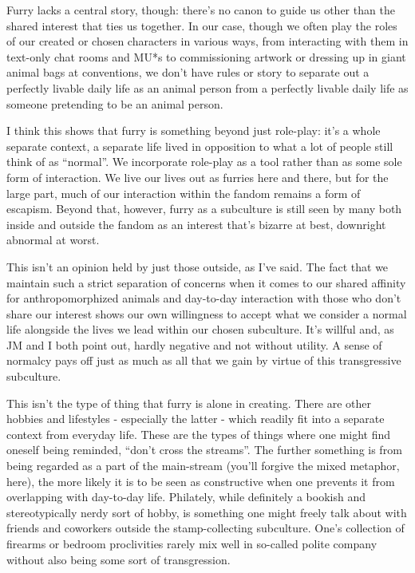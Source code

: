 Furry lacks a central story, though: there's no canon to guide us other
than the shared interest that ties us together. In our case, though we
often play the roles of our created or chosen characters in various
ways, from interacting with them in text-only chat rooms and MU*s to
commissioning artwork or dressing up in giant animal bags at
conventions, we don't have rules or story to separate out a perfectly
livable daily life as an animal person from a perfectly livable daily
life as someone pretending to be an animal person.

I think this shows that furry is something beyond just role-play: it's a
whole separate context, a separate life lived in opposition to what a
lot of people still think of as ``normal''. We incorporate role-play as
a tool rather than as some sole form of interaction. We live our lives
out as furries here and there, but for the large part, much of our
interaction within the fandom remains a form of escapism. Beyond that,
however, furry as a subculture is still seen by many both inside and
outside the fandom as an interest that's bizarre at best, downright
abnormal at worst.

This isn't an opinion held by just those outside, as I've said. The fact
that we maintain such a strict separation of concerns when it comes to
our shared affinity for anthropomorphized animals and day-to-day
interaction with those who don't share our interest shows our own
willingness to accept what we consider a normal life alongside the lives
we lead within our chosen subculture. It's willful and, as JM and I both
point out, hardly negative and not without utility. A sense of normalcy
pays off just as much as all that we gain by virtue of this
transgressive subculture.

This isn't the type of thing that furry is alone in creating. There are
other hobbies and lifestyles - especially the latter - which readily fit
into a separate context from everyday life. These are the types of
things where one might find oneself being reminded, ``don't cross the
streams''. The further something is from being regarded as a part of the
main-stream (you'll forgive the mixed metaphor, here), the more likely
it is to be seen as constructive when one prevents it from overlapping
with day-to-day life. Philately, while definitely a bookish and
stereotypically nerdy sort of hobby, is something one might freely talk
about with friends and coworkers outside the stamp-collecting
subculture. One's collection of firearms or bedroom proclivities rarely
mix well in so-called polite company without also being some sort of
transgression.

